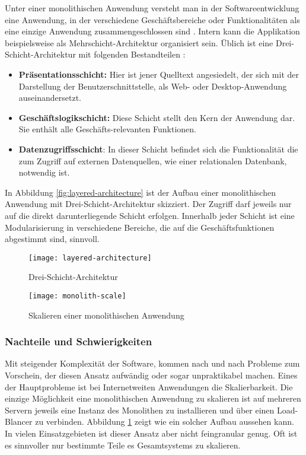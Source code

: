 Unter einer monolithischen Anwendung versteht man in der Softwareentwicklung eine Anwendung, in der verschiedene Geschäftsbereiche oder Funktionalitäten als eine einzige Anwendung zusammengeschlossen sind \cite{FowlerMS}. Intern kann die Applikation beispielsweise als Mehrschicht-Architektur organisiert sein. Üblich ist eine Drei-Schicht-Architektur mit folgenden Bestandteilen \cite{FowlerPEA}:

\begin{itemize}
	\item \textbf{Präsentationsschicht:} Hier ist jener Quelltext angesiedelt, der sich mit der Darstellung der Benutzerschnittstelle, \zB als Web- oder Desktop-Anwendung auseinandersetzt.
	\item \textbf{Geschäftslogikschicht:} Diese Schicht stellt den Kern der Anwendung dar. Sie enthält alle Geschäfts-relevanten Funktionen.
	\item \textbf{Datenzugriffsschicht}: In dieser Schicht befindet sich die Funktionalität die zum Zugriff auf externen Datenquellen, wie \zB einer relationalen Datenbank, notwendig ist.
\end{itemize}


In Abbildung \ref{fig:layered-architecture} ist der Aufbau einer monolithischen Anwendung mit Drei-Schicht-Architektur skizziert. Der Zugriff darf jeweils nur auf die direkt darunterliegende Schicht erfolgen. Innerhalb jeder Schicht ist eine Modularisierung in verschiedene Bereiche, die auf die Geschäftsfunktionen abgestimmt sind, sinnvoll.

\begin{figure}[!htb]
\centering
{}
  \centering
	\texttt{[image: layered-architecture]}
	\caption{Drei-Schicht-Architektur}
	\label{fig:layered-architecture}
\endminipage
{}
  \centering
	\texttt{[image: monolith-scale]}
	\caption{Skalieren einer monolithischen Anwendung}
	\label{fig:monolith-scale}
\endminipage
\end{figure}

\subsubsection{Nachteile und Schwierigkeiten}

Mit steigender Komplexität der Software, kommen nach und nach Probleme zum Vorschein, der diesen Ansatz aufwändig oder sogar unpraktikabel machen. Eines der Hauptprobleme ist bei Internetweiten Anwendungen die Skalierbarkeit. Die einzige Möglichkeit eine monolithischen Anwendung zu skalieren ist auf mehreren Servern jeweils eine Instanz des Monolithen zu installieren und über einen Load-Blancer zu verbinden. Abbildung \ref{fig:monolith-scale} zeigt wie ein solcher Aufbau aussehen kann. In vielen Einsatzgebieten ist dieser Ansatz aber nicht feingranular genug. Oft ist es sinnvoller nur bestimmte Teile es Gesamtsystems zu skalieren.

